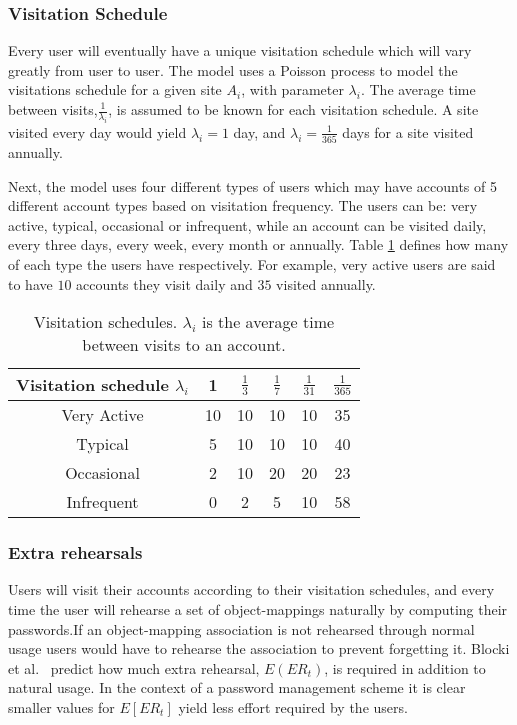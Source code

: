 \subsubsection{Visitation Schedule}
Every user will eventually have a unique visitation schedule which will vary greatly from user to user. The model uses a Poisson process to model the visitations schedule for a given site $A_i$, with parameter $\lambda_i$. The average time between visits,$\frac{1}{\lambda_i}$, is assumed to be known for each visitation schedule. A site visited every day would yield $\lambda_i = 1$ day, and $\lambda_i=\frac{1}{365}$ days for a site visited annually. 
\par Next, the model uses four different types of users which may have accounts of 5 different account types based on visitation frequency. The users can be: very active, typical, occasional or infrequent, while an account can be visited daily, every three days, every week, every month or annually. Table \ref{users} defines how many of each type the users have respectively. For example, very active users are said to have $10$ accounts they visit daily and $35$ visited annually.

\begin{table}[ht]
    \centering
\begin{tabular}{|c||c|c|c|c|c|}
    \hline
    Visitation schedule $\lambda_i$ & 1 & $\frac{1}{3}$ & $\frac{1}{7}$ & $\frac{1}{31}$ & $\frac{1}{365}$ \\
    \hline \hline
    Very Active & 10 &10 &10 &10 & 35 \\
    \hline
    Typical & 5 & 10 & 10 & 10 & 40 \\
    \hline
    Occasional & 2 & 10 & 20 & 20 & 23 \\
    \hline
    Infrequent & 0 & 2 & 5 & 10 &  58 \\
    \hline
\end{tabular}
\caption{Visitation schedules. $\lambda_i$ is the average time between visits to an account.}
\label{users}
\end{table}


\subsubsection{Extra rehearsals}
Users will visit their accounts according to their visitation schedules, and every time the user will rehearse a set of object-mappings naturally by computing their passwords.If an object-mapping association is not rehearsed through normal usage users would have to rehearse the association to prevent forgetting it. Blocki et al.~\cite{naturally-rehearsing} predict how much extra rehearsal, $E(ER_t)$, is required in addition to natural usage. In the context of a password management scheme it is clear smaller values for $E[ER_t]$ yield less effort required by the users.

